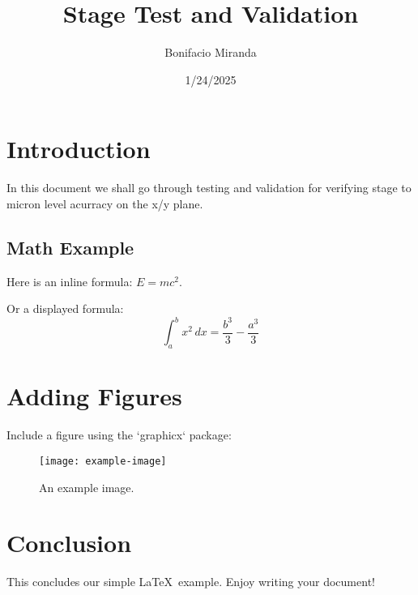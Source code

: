 \documentclass{article} %
\title{Stage Test and Validation} %
\author{Bonifacio Miranda}         %
\date{1/24/2025}              %
\begin{document}
\maketitle                 %

\section{Introduction}     %
In this document we shall go through testing and validation for verifying stage to micron level acurracy on the x/y plane.


\subsection{Math Example}  %
Here is an inline formula: \(E = mc^2\). 

Or a displayed formula:
\[
\int_a^b x^2 \, dx = \frac{b^3}{3} - \frac{a^3}{3}
\]

\section{Adding Figures}
Include a figure using the `graphicx` package:
\begin{figure}[h]
    \centering
    \texttt{[image: example-image]} %
    \caption{An example image.}
    \label{fig:example}
\end{figure}

\section{Conclusion}
This concludes our simple \LaTeX\ example. Enjoy writing your document!
\end{document}
